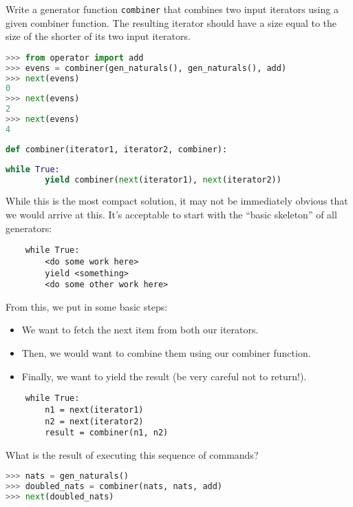 \question Write a generator function \texttt{combiner} that combines two input
iterators using a given combiner function. The resulting iterator should have a
size equal to the size of the shorter of its two input iterators.

\begin{minipage}{\textwidth}
\begin{lstlisting}[language=Python]
>>> from operator import add
>>> evens = combiner(gen_naturals(), gen_naturals(), add)
>>> next(evens)
0
>>> next(evens)
2
>>> next(evens)
4
\end{lstlisting}
\begin{lstlisting}[language=Python]
def combiner(iterator1, iterator2, combiner):
\end{lstlisting}

\begin{solution}[0.75in]
\begin{lstlisting}[language=Python]
    while True:
        yield combiner(next(iterator1), next(iterator2))
\end{lstlisting}
While this is the most compact solution, it may not be immediately obvious that
we would arrive at this. It's acceptable to start with the ``basic skeleton'' of
all generators:

\begin{lstlisting}
    while True:
        <do some work here>
        yield <something>
        <do some other work here>
\end{lstlisting}

From this, we put in some basic steps:
\begin{itemize}
    \item We want to fetch the next item from both our iterators.
    \item Then, we would want to combine them using our combiner function.
    \item Finally, we want to yield the result (be very careful not to return!).
\end{itemize}

\begin{lstlisting}
    while True:
        n1 = next(iterator1)
        n2 = next(iterator2)
        result = combiner(n1, n2)
\end{lstlisting}

\end{solution}
\end{minipage}

\question What is the result of executing this sequence of commands?
\begin{lstlisting}[language=Python]
>>> nats = gen_naturals()
>>> doubled_nats = combiner(nats, nats, add)
>>> next(doubled_nats)
\end{lstlisting}

